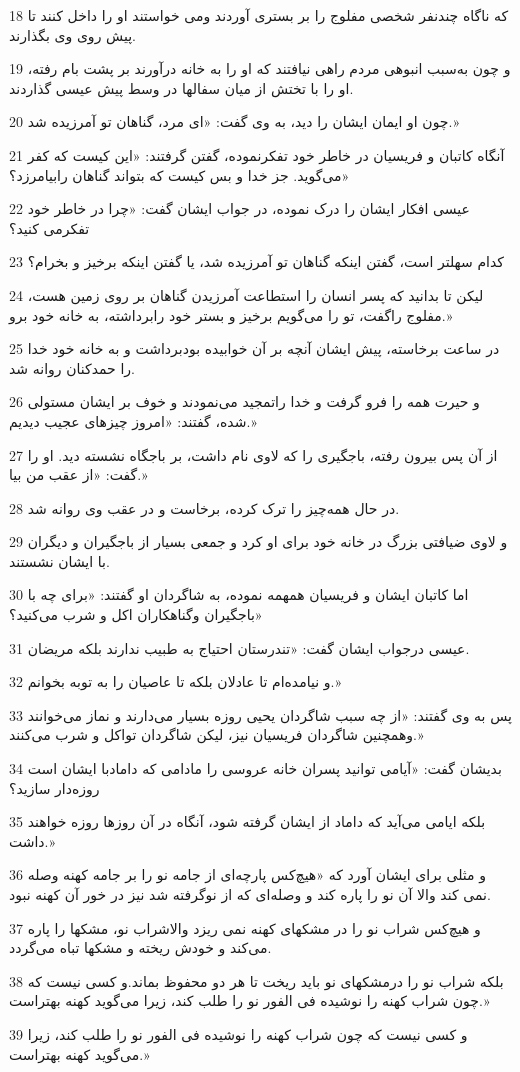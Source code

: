 \par 18 که ناگاه چندنفر شخصی مفلوج را بر بستری آوردند ومی خواستند او را داخل کنند تا پیش روی وی بگذارند.
\par 19 و چون به‌سبب انبوهی مردم راهی نیافتند که او را به خانه درآورند بر پشت بام رفته، او را با تختش از میان سفالها در وسط پیش عیسی گذاردند.
\par 20 چون او ایمان ایشان را دید، به وی گفت: «ای مرد، گناهان تو آمرزیده شد.»
\par 21 آنگاه کاتبان و فریسیان در خاطر خود تفکرنموده، گفتن گرفتند: «این کیست که کفر می‌گوید. جز خدا و بس کیست که بتواند گناهان رابیامرزد؟»
\par 22 عیسی افکار ایشان را درک نموده، در جواب ایشان گفت: «چرا در خاطر خود تفکرمی کنید؟
\par 23 کدام سهلتر است، گفتن اینکه گناهان تو آمرزیده شد، یا گفتن اینکه برخیز و بخرام؟
\par 24 لیکن تا بدانید که پسر انسان را استطاعت آمرزیدن گناهان بر روی زمین هست، مفلوج راگفت، تو را می‌گویم برخیز و بستر خود رابرداشته، به خانه خود برو.»
\par 25 در ساعت برخاسته، پیش ایشان آنچه بر آن خوابیده بودبرداشت و به خانه خود خدا را حمدکنان روانه شد.
\par 26 و حیرت همه را فرو گرفت و خدا راتمجید می‌نمودند و خوف بر ایشان مستولی شده، گفتند: «امروز چیزهای عجیب دیدیم.»
\par 27 از آن پس بیرون رفته، باجگیری را که لاوی نام داشت، بر باجگاه نشسته دید. او را گفت: «از عقب من بیا.»
\par 28 در حال همه‌چیز را ترک کرده، برخاست و در عقب وی روانه شد.
\par 29 و لاوی ضیافتی بزرگ در خانه خود برای او کرد و جمعی بسیار از باجگیران و دیگران با ایشان نشستند.
\par 30 اما کاتبان ایشان و فریسیان همهمه نموده، به شاگردان او گفتند: «برای چه با باجگیران وگناهکاران اکل و شرب می‌کنید؟»
\par 31 عیسی درجواب ایشان گفت: «تندرستان احتیاج به طبیب ندارند بلکه مریضان.
\par 32 و نیامده‌ام تا عادلان بلکه تا عاصیان را به توبه بخوانم.»
\par 33 پس به وی گفتند: «از چه سبب شاگردان یحیی روزه بسیار می‌دارند و نماز می‌خوانند وهمچنین شاگردان فریسیان نیز، لیکن شاگردان تواکل و شرب می‌کنند.»
\par 34 بدیشان گفت: «آیامی توانید پسران خانه عروسی را مادامی که دامادبا ایشان است روزه‌دار سازید؟
\par 35 بلکه ایامی می‌آید که داماد از ایشان گرفته شود، آنگاه در آن روزها روزه خواهند داشت.»
\par 36 و مثلی برای ایشان آورد که «هیچ‌کس پارچه‌ای از جامه نو را بر جامه کهنه وصله نمی کند والا آن نو را پاره کند و وصله‌ای که از نوگرفته شد نیز در خور آن کهنه نبود.
\par 37 و هیچ‌کس شراب نو را در مشکهای کهنه نمی ریزد والاشراب نو، مشکها را پاره می‌کند و خودش ریخته و مشکها تباه می‌گردد.
\par 38 بلکه شراب نو را درمشکهای نو باید ریخت تا هر دو محفوظ بماند.و کسی نیست که چون شراب کهنه را نوشیده فی الفور نو را طلب کند، زیرا می‌گوید کهنه بهتراست.»
\par 39 و کسی نیست که چون شراب کهنه را نوشیده فی الفور نو را طلب کند، زیرا می‌گوید کهنه بهتراست.»

